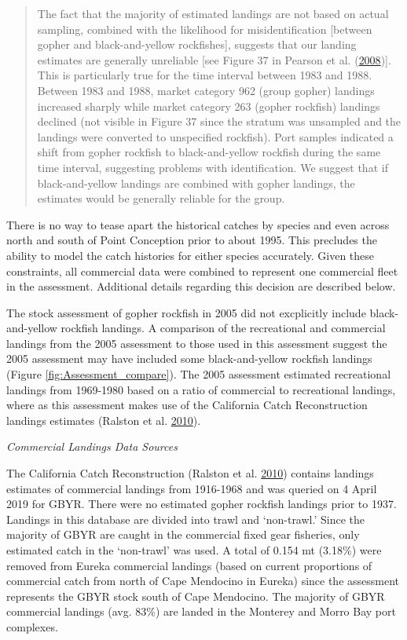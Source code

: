 \documentclass[12pt,]{article}
\begin{document}
\begin{quote}
The fact that the majority of estimated landings are not based on actual
sampling, combined with the likelihood for misidentification {[}between
gopher and black-and-yellow rockfishes{]}, suggests that our landing
estimates are generally unreliable {[}see Figure 37 in Pearson et al.
(\protect\hyperlink{ref-Pearson2008}{2008}){]}. This is particularly
true for the time interval between 1983 and 1988. Between 1983 and 1988,
market category 962 (group gopher) landings increased sharply while
market category 263 (gopher rockfish) landings declined (not visible in
Figure 37 since the stratum was unsampled and the landings were
converted to unspecified rockfish). Port samples indicated a shift from
gopher rockfish to black-and-yellow rockfish during the same time
interval, suggesting problems with identification. We suggest that if
black-and-yellow landings are combined with gopher landings, the
estimates would be generally reliable for the group.
\end{quote}

There is no way to tease apart the historical catches by species and
even across north and south of Point Conception prior to about 1995.
This precludes the ability to model the catch histories for either
species accurately. Given these constraints, all commercial data were
combined to represent one commercial fleet in the assessment. Additional
details regarding this decision are described below.

The stock assessment of gopher rockfish in 2005 did not excplicitly
include black-and-yellow rockfish landings. A comparison of the
recreational and commercial landings from the 2005 assessment to those
used in this assessment suggest the 2005 assessment may have included
some black-and-yellow rockfish landings (Figure
\ref{fig:Assessment_compare}). The 2005 assessment estimated
recreational landings from 1969-1980 based on a ratio of commercial to
recreational landings, where as this assessment makes use of the
California Catch Reconstruction landings estimates (Ralston et al.
\protect\hyperlink{ref-Ralston2010}{2010}).

\emph{Commercial Landings Data Sources}

The California Catch Reconstruction (Ralston et al.
\protect\hyperlink{ref-Ralston2010}{2010}) contains landings estimates
of commercial landings from 1916-1968 and was queried on 4 April 2019
for GBYR. There were no estimated gopher rockfish landings prior to
1937. Landings in this database are divided into trawl and `non-trawl.'
Since the majority of GBYR are caught in the commercial fixed gear
fisheries, only estimated catch in the `non-trawl' was used. A total of
0.154 mt (3.18\%) were removed from Eureka commercial landings (based on
current proportions of commercial catch from north of Cape Mendocino in
Eureka) since the assessment represents the GBYR stock south of Cape
Mendocino. The majority of GBYR commercial landings (avg. 83\%) are
landed in the Monterey and Morro Bay port complexes.
\end{document}
